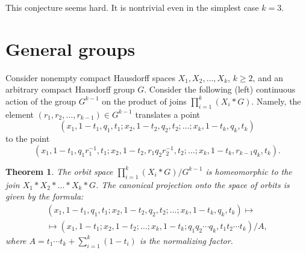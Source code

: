 \documentclass[english, 12pt]{amsproc}
\newcounter{thcounter}
\numberwithin{equation}{section}
\theoremstyle{plain}
\newtheorem{thm}[thcounter]{Theorem}
\theoremstyle{definition}
\theoremstyle{remark}
\begin{document}
This conjecture seems hard. It is nontrivial even in the simplest case $k=3$.


\section{General groups}\label{secGeneralJoins}

Consider nonempty compact Hausdorff spaces $X_1,X_2,\ldots, X_k$, $k\geqslant 2$, and an arbitrary compact Hausdorff group $G$. Consider the following (left) continuous action of the group $G^{k-1}$ on the product of joins $\prod_{i=1}^{k}(X_i\ast G)$.
Namely, the element $(r_1,r_2,\ldots, r_{k-1})\in G^{k-1}$ translates a point
\[
(x_1,1-t_1, q_1,t_1; x_2,1-t_2, q_2,t_2; \ldots; x_k,1-t_k, q_k,t_k)
\]
to the point
\begin{equation}\label{eqCodiagonalAcn}
(x_1,1-t_1, q_1r_1^{-1},t_1; x_2,1-t_2, r_1q_2r_2^{-1},t_2; \ldots; x_k,1-t_k, r_{k-1}q_k,t_k).
\end{equation}

\begin{thm}\label{thmJoins}
The orbit space $\prod_{i=1}^{k}(X_i\ast G)/G^{k-1}$ is homeomorphic to the join
$X_1\ast X_2\ast \ldots\ast X_k\ast G$. The canonical projection onto the space of orbits is given by the formula:
\begin{multline}\label{eqJoinMap}
(x_1,1-t_1, q_1,t_1; x_2,1-t_2, q_2,t_2; \ldots; x_k,1-t_k, q_k,t_k) \mapsto \\
\mapsto (x_1,1-t_1;x_2,1-t_2;\ldots; x_k,1-t_k; q_1q_2\cdots q_k, t_1t_2\cdots t_k)/A,
\end{multline}
where $A=t_1\cdots t_k+\sum\nolimits_{i=1}^{k}(1-t_i)$ is the normalizing factor.
\end{thm}
\end{document}
